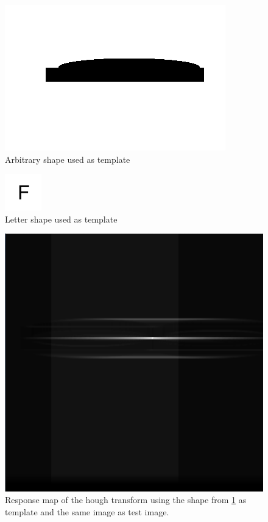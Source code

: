 \documentclass[11pt,a4paper]{article}
\begin{document}
\begin{figure}
\centering
\includegraphics[scale=.4]{img/templateShape.png}

\caption{Arbitrary shape used as template}
\label{fig:1}
\end{figure}

\begin{figure}
\centering
\includegraphics[scale=.4]{img/templateLetter.png}

\caption{Letter shape used as template}
\label{fig:2}
\end{figure}

\begin{figure}
\centering
\includegraphics[scale=.4]{img/mapTemplate.png}

\caption{Response map of the hough transform using the shape from \ref{fig:1} as template and the same image as test image.}
\label{fig:3}
\end{figure}
\end{document}
